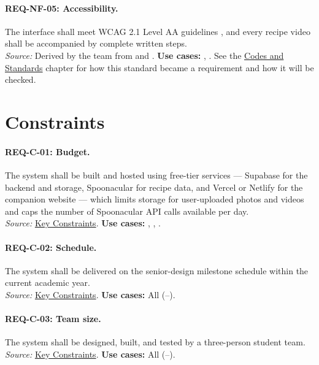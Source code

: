 \paragraph{REQ-NF-05: Accessibility.}
 The interface shall meet WCAG 2.1 Level AA guidelines \cite{WCAG21}, and every recipe video shall be accompanied by complete written steps.\\
\textit{Source:} Derived by the team from  and . \textbf{Use cases:} , . See the \hyperref[Chapter:CodesStandards]{Codes and Standards} chapter for how this standard became a requirement and how it will be checked.

\section{Constraints}

\paragraph{REQ-C-01: Budget.}
 The system shall be built and hosted using free-tier services --- Supabase for the backend and storage, Spoonacular for recipe data, and Vercel or Netlify for the companion website --- which limits storage for user-uploaded photos and videos and caps the number of Spoonacular API calls available per day.\\
\textit{Source:} \hyperref[Chapter:KeyConstraints]{Key Constraints}. \textbf{Use cases:} , , .

\paragraph{REQ-C-02: Schedule.}
 The system shall be delivered on the senior-design milestone schedule within the current academic year.\\
\textit{Source:} \hyperref[Chapter:KeyConstraints]{Key Constraints}. \textbf{Use cases:} All (--).

\paragraph{REQ-C-03: Team size.}
 The system shall be designed, built, and tested by a three-person student team.\\
\textit{Source:} \hyperref[Chapter:KeyConstraints]{Key Constraints}. \textbf{Use cases:} All (--).

